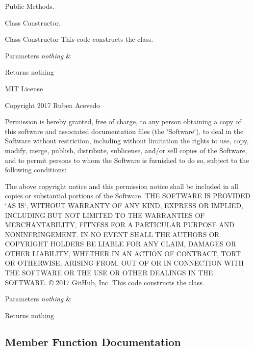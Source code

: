 Public Methods. 

Class Constructor.

Class Constructor This code constructs the class. 
\begin{DoxyParams}{Parameters}
{\em nothing} & \\
\hline
\end{DoxyParams}
\begin{DoxyReturn}{Returns}
nothing
\end{DoxyReturn}
M\+IT License

Copyright 2017 Ruben Acevedo

Permission is hereby granted, free of charge, to any person obtaining a copy of this software and associated documentation files (the \char`\"{}\+Software\char`\"{}), to deal in the Software without restriction, including without limitation the rights to use, copy, modify, merge, publish, distribute, sublicense, and/or sell copies of the Software, and to permit persons to whom the Software is furnished to do so, subject to the following conditions\+:

The above copyright notice and this permission notice shall be included in all copies or substantial portions of the Software. T\+HE S\+O\+F\+T\+W\+A\+RE IS P\+R\+O\+V\+I\+D\+ED \char`\"{}\+A\+S I\+S\char`\"{}, W\+I\+T\+H\+O\+UT W\+A\+R\+R\+A\+N\+TY OF A\+NY K\+I\+ND, E\+X\+P\+R\+E\+SS OR I\+M\+P\+L\+I\+ED, I\+N\+C\+L\+U\+D\+I\+NG B\+UT N\+OT L\+I\+M\+I\+T\+ED TO T\+HE W\+A\+R\+R\+A\+N\+T\+I\+ES OF M\+E\+R\+C\+H\+A\+N\+T\+A\+B\+I\+L\+I\+TY, F\+I\+T\+N\+E\+SS F\+OR A P\+A\+R\+T\+I\+C\+U\+L\+AR P\+U\+R\+P\+O\+SE A\+ND N\+O\+N\+I\+N\+F\+R\+I\+N\+G\+E\+M\+E\+NT. IN NO E\+V\+E\+NT S\+H\+A\+LL T\+HE A\+U\+T\+H\+O\+RS OR C\+O\+P\+Y\+R\+I\+G\+HT H\+O\+L\+D\+E\+RS BE L\+I\+A\+B\+LE F\+OR A\+NY C\+L\+A\+IM, D\+A\+M\+A\+G\+ES OR O\+T\+H\+ER L\+I\+A\+B\+I\+L\+I\+TY, W\+H\+E\+T\+H\+ER IN AN A\+C\+T\+I\+ON OF C\+O\+N\+T\+R\+A\+CT, T\+O\+RT OR O\+T\+H\+E\+R\+W\+I\+SE, A\+R\+I\+S\+I\+NG F\+R\+OM, O\+UT OF OR IN C\+O\+N\+N\+E\+C\+T\+I\+ON W\+I\+TH T\+HE S\+O\+F\+T\+W\+A\+RE OR T\+HE U\+SE OR O\+T\+H\+ER D\+E\+A\+L\+I\+N\+GS IN T\+HE S\+O\+F\+T\+W\+A\+RE. © 2017 Git\+Hub, Inc. This code constructs the class. 
\begin{DoxyParams}{Parameters}
{\em nothing} & \\
\hline
\end{DoxyParams}
\begin{DoxyReturn}{Returns}
nothing 
\end{DoxyReturn}


\subsection{Member Function Documentation}
